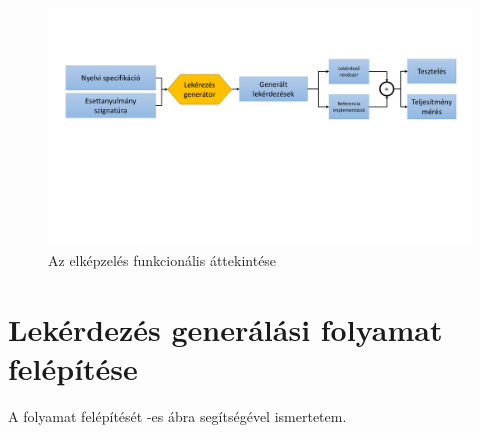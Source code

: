 \begin{figure}
	\centering
	\includegraphics[width=1.0\textwidth]{figures/funkcionalisAttekintes}
	\caption{Az elképzelés funkcionális áttekintése}
	\label{fig:funkcionalisAttekintes}
\end{figure}
 
  

\section{Lekérdezés generálási folyamat felépítése}


A folyamat felépítését  -es ábra segítségével ismertetem.  


